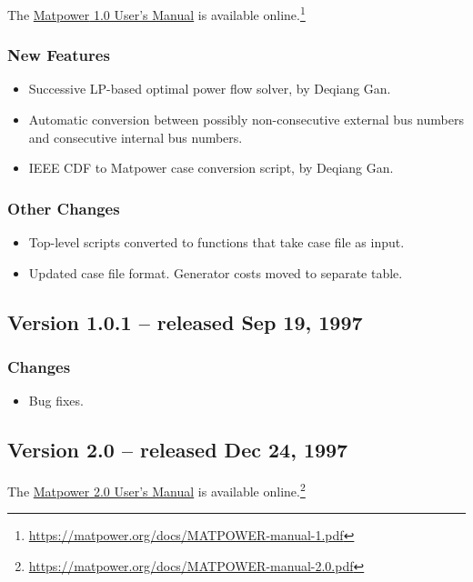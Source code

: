 \documentclass[12pt]{article}
\newcommand{\matpower}[0]{{\sc Matpower}}
\newcommand{\code}[1]{{\relsize{-0.5}{\tt{{#1}}}}}  %
\newcommand{\gencost}[0]{\code{gencost}}
\numberwithin{equation}{section}
\numberwithin{table}{section}
\numberwithin{figure}{section}
\begin{document}
\begin{appendices}
The \href{https://matpower.org/docs/MATPOWER-manual-1.pdf}{\matpower{} 1.0 User's Manual} is available online.\footnote{\url{https://matpower.org/docs/MATPOWER-manual-1.pdf}}

\subsubsection*{New Features}
\begin{itemize}
\item Successive LP-based optimal power flow solver, by Deqiang Gan.
\item Automatic conversion between possibly non-consecutive external bus numbers and consecutive internal bus numbers.
\item IEEE CDF to \matpower{} case conversion script, by Deqiang Gan.
\end{itemize}

\subsubsection*{Other Changes}
\begin{itemize}
\item Top-level scripts converted to functions that take case file as input.
\item Updated case file format. Generator costs moved to separate \gencost{} table.
\end{itemize}

\subsection{Version 1.0.1 -- released Sep 19, 1997}
\label{app:v101}

\subsubsection*{Changes}
\begin{itemize}
\item Bug fixes.
\end{itemize}

\clearpage
\subsection{Version 2.0 -- released Dec 24, 1997}
\label{app:v20}

The \href{https://matpower.org/docs/MATPOWER-manual-2.0.pdf}{\matpower{} 2.0 User's Manual} is available online.\footnote{\url{https://matpower.org/docs/MATPOWER-manual-2.0.pdf}}


\end{appendices}
\end{document}
